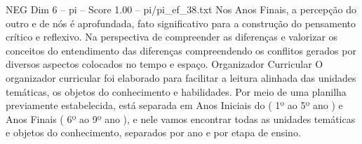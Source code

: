 \begin{textsample}{NEG Dim 6 – pi – Score 1.00 – pi/pi\_ef\_38.txt}
Nos Anos Finais, a percepção do outro e de nós é aprofundada, fato significativo para a construção do pensamento crítico e reflexivo.
Na perspectiva de compreender as diferenças e valorizar os conceitos do entendimento das diferenças compreendendo os conflitos gerados por diversos aspectos colocados no tempo e espaço.
Organizador Curricular O organizador curricular foi elaborado para facilitar a leitura alinhada das unidades temáticas, os objetos do conhecimento e habilidades.
Por meio de uma planilha previamente estabelecida, está separada em Anos Iniciais do ( 1º ao 5º ano ) e Anos Finais ( 6º ao 9º ano ), e nele vamos encontrar todas as unidades temáticas e objetos do conhecimento, separados por ano e por etapa de ensino.

\end{textsample}
